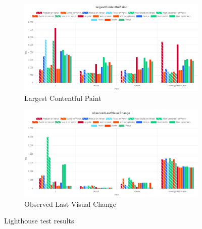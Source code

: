 \documentclass[a4paper, 10pt]{article}
\begin{document}
\begin{figure}[ht!]\ContinuedFloat
  \centering
  \begin{subfigure}{0.95\linewidth}
    \begin{center}
      \includegraphics[width=\linewidth, keepaspectratio]{img/lighthouse-results/LCP.png}
    \end{center}
    \caption{Largest Contentful Paint}\label{subfig:LH:largestContentfulPaint}
  \end{subfigure}
  \begin{subfigure}{0.95\linewidth}
    \begin{center}
      \includegraphics[width=\linewidth, keepaspectratio]{img/lighthouse-results/OLVC.png}
    \end{center}
    \caption{Observed Last Visual Change}\label{subfig:LH:observedLastVisualChange}
  \end{subfigure}
  \caption{Lighthouse test results}\label{fig:lighthouseResults}
\end{figure}
\end{document}
